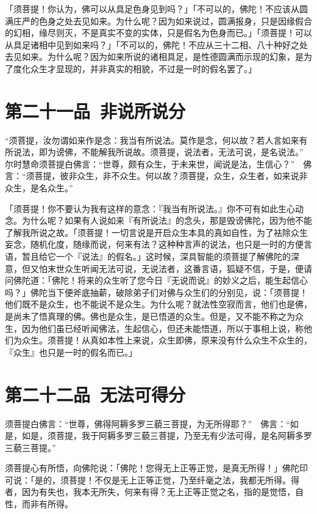 \documentclass[12pt,twoside,openany]{book}
\newcommand{\kai}[1]{{\CJKfamily{kai}#1}}
\begin{document}
\kai{「须菩提！你认为，佛可以从具足色身见到吗？」「不可以的，佛陀！不应该从圆满庄严的色身之处去见如来。为什么呢？因为如来说过，圆满报身，只是因缘假合的幻相，缘尽则灭，不是真实不变的实体，只是假名为色身而已。」「须菩提！可以从具足诸相中见到如来吗？」「不可以的，佛陀！不应从三十二相、八十种好之处去见如来。为什么呢？因为如来所说的诸相具足，是性德圆满而示现的幻象，是为了度化众生才显现的，并非真实的相貌，不过是一时的假名罢了。」}

\chapter{第二十一品\ 非说所说分}
\begin{pinyinscope}
“须菩提，汝勿谓如来作是念：我当有所说法。莫作是念，何以故？若人言如来有所说法，即为谤佛，不能解我所说故。须菩提，说法者，无法可说，是名说法。”　尔时慧命须菩提白佛言：“世尊，颇有众生，于未来世，闻说是法，生信心？”　佛言：“须菩提，彼非众生，非不众生。何以故？须菩提，众生，众生者，如来说非众生，是名众生。”
\end{pinyinscope}

\kai{「须菩提！你不要认为我有这样的意念：『我当有所说法。』你不可有如此生心动念。为什么呢？如果有人说如来『有所说法』的念头，那是毁谤佛陀，因为他不能了解我所说之故。「须菩提！一切言说是开启众生本具的真如自性，为了袪除众生妄念，随机化度，随缘而说，何来有法？这种种言声的说法，也只是一时的方便言语，暂且给它一个『说法』的假名。」这时候，深具智能的须菩提了解佛陀的深意，但又怕末世众生听闻无法可说，无说法者，这番言语，狐疑不信，于是，便请问佛陀道：「佛陀！将来的众生听了您今日『无说而说』的妙义之后，能生起信心吗？」佛陀当下便斧底抽薪，破除弟子们对佛与众生们的分别见，说：「须菩提！他们既不是众生，也不能说不是众生。为什么呢？就法性空寂而言，他们也是佛，是尚未了悟真理的佛。佛也是众生，是已悟道的众生。但是，又不能不称之为众生，因为他们虽已经听闻佛法，生起信心，但还未能悟道，所以于事相上说，称他们为众生。须菩提！从真如本性上来说，众生即佛，原来没有什么众生不众生的，『众生』也只是一时的假名而已。」}

\chapter{第二十二品\ 无法可得分}
\begin{pinyinscope}
须菩提白佛言：“世尊，佛得阿耨多罗三藐三菩提，为无所得耶？”　佛言：“如是，如是，须菩提，我于阿耨多罗三藐三菩提，乃至无有少法可得，是名阿耨多罗三藐三菩提。”
\end{pinyinscope}

\kai{须菩提心有所悟，向佛陀说：「佛陀！您得无上正等正觉，是真无所得！」佛陀印可说：「是的，须菩提！不仅是无上正等正觉，乃至纤毫之法，我都无所得。得者，因为有失也，我本无所失，何来有得？无上正等正觉之名，指的是觉悟，自性，而非有所得。}
\end{document}
